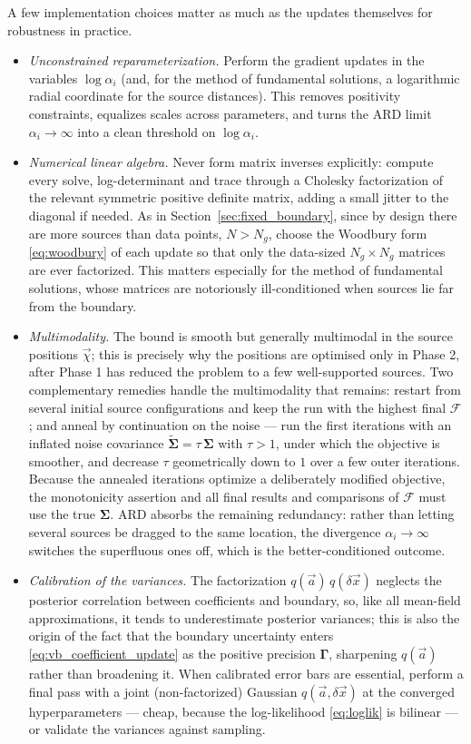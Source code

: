 \documentclass{article}
\begin{document}
A few implementation choices matter as much as the updates themselves for robustness in practice.
\begin{itemize}
    \item \emph{Unconstrained reparameterization.} Perform the gradient updates in the variables $\log\alpha_i$ (and, for the method of fundamental solutions, a logarithmic radial coordinate for the source distances). This removes positivity constraints, equalizes scales across parameters, and turns the ARD limit $\alpha_i\to\infty$ into a clean threshold on $\log\alpha_i$.
    \item \emph{Numerical linear algebra.} Never form matrix inverses explicitly: compute every solve, log-determinant and trace through a Cholesky factorization of the relevant symmetric positive definite matrix, adding a small jitter to the diagonal if needed. As in Section~\ref{sec:fixed_boundary}, since by design there are more sources than data points, $N > N_g$, choose the Woodbury form \eqref{eq:woodbury} of each update so that only the data-sized $N_g \times N_g$ matrices are ever factorized. This matters especially for the method of fundamental solutions, whose matrices are notoriously ill-conditioned when sources lie far from the boundary.
    \item \emph{Multimodality.} The bound is smooth but generally multimodal in the source positions $\vec\chi$; this is precisely why the positions are optimised only in Phase 2, after Phase 1 has reduced the problem to a few well-supported sources. Two complementary remedies handle the multimodality that remains: restart from several initial source configurations and keep the run with the highest final $\mathcal F$; and anneal by continuation on the noise --- run the first iterations with an inflated noise covariance $\tilde{\mathbf{\Sigma}} = \tau\,\mathbf{\Sigma}$ with $\tau > 1$, under which the objective is smoother, and decrease $\tau$ geometrically down to $1$ over a few outer iterations. Because the annealed iterations optimize a deliberately modified objective, the monotonicity assertion and all final results and comparisons of $\mathcal F$ must use the true $\mathbf{\Sigma}$. ARD absorbs the remaining redundancy: rather than letting several sources be dragged to the same location, the divergence $\alpha_i \to \infty$ switches the superfluous ones off, which is the better-conditioned outcome.
    \item \emph{Calibration of the variances.} The factorization $q(\vec a)\,q(\delta\vec x)$ neglects the posterior correlation between coefficients and boundary, so, like all mean-field approximations, it tends to underestimate posterior variances; this is also the origin of the fact that the boundary uncertainty enters \eqref{eq:vb_coefficient_update} as the positive precision $\mathbf\Gamma$, sharpening $q(\vec a)$ rather than broadening it. When calibrated error bars are essential, perform a final pass with a joint (non-factorized) Gaussian $q(\vec a, \delta\vec x)$ at the converged hyperparameters --- cheap, because the log-likelihood \eqref{eq:loglik} is bilinear --- or validate the variances against sampling.
\end{itemize}
\end{document}
